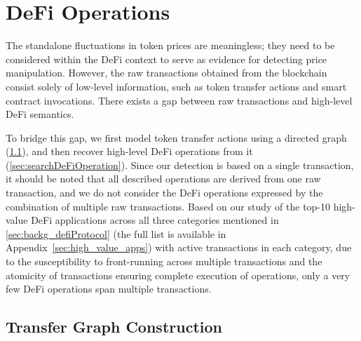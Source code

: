 \section{DeFi Operations}
\label{sec:defiOperation} 

The standalone fluctuations in token prices are meaningless; they need to be considered within the DeFi context to serve as evidence for detecting price manipulation.
However, the raw transactions obtained from the blockchain consist solely of low-level information, such as token transfer actions and smart contract invocations.
There exists a gap between raw transactions and high-level DeFi semantics.

To bridge this gap, we first model token transfer actions using a directed graph (\mysec\ref{sec:transferGraph}), and then recover high-level DeFi operations from it (\mysec\ref{sec:searchDeFiOperation}).
Since our detection is based on a single transaction, it should be noted that all described operations are derived from one raw transaction, and we do not consider the DeFi operations expressed by the combination of multiple raw transactions.
Based on our study of the top-10 high-value DeFi applications across all three categories mentioned in \mysec\ref{sec:backg_defiProtocol} (the full list is available in Appendix~\ref{sec:high_value_apps}) with active transactions in each category, due to the susceptibility to front-running across multiple transactions and the atomicity of transactions ensuring complete execution of operations, only a very few DeFi operations span multiple transactions.



\subsection{Transfer Graph Construction}
\label{sec:transferGraph}

